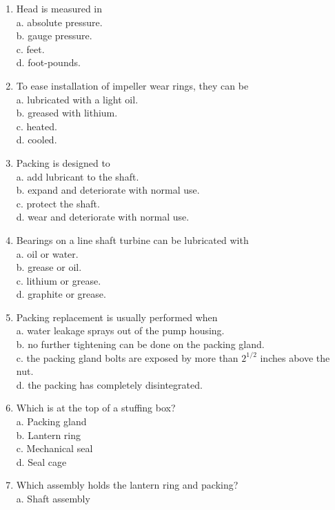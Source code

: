 \begin{enumerate}[1.]
\item Head is measured in\\
a. absolute pressure.\\
b. gauge pressure.\\
c. feet.\\
d. foot-pounds.\\
\item To ease installation of impeller wear rings, they can be\\
a. lubricated with a light oil.\\
b. greased with lithium.\\
c. heated.\\
d. cooled.\\
\item Packing is designed to\\
a. add lubricant to the shaft.\\
b. expand and deteriorate with normal use.\\
c. protect the shaft.\\
d. wear and deteriorate with normal use.\\
\item Bearings on a line shaft turbine can be lubricated with\\
a. oil or water.\\
b. grease or oil.\\
c. lithium or grease.\\
d. graphite or grease.\\
\item Packing replacement is usually performed when\\
a. water leakage sprays out of the pump housing.\\
b. no further tightening can be done on the packing gland.\\
c. the packing gland bolts are exposed by more than $2^{1 / 2}$ inches above the nut.\\
d. the packing has completely disintegrated.\\
\item Which is at the top of a stuffing box?\\
a. Packing gland\\
b. Lantern ring\\
c. Mechanical seal\\
d. Seal cage\\
\item Which assembly holds the lantern ring and packing?\\
a. Shaft assembly\\

\end{enumerate}
